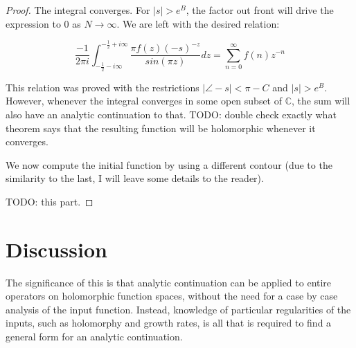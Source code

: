 \documentclass{article}
\begin{document}
\begin{proof}
		The integral converges. For $\left| s \right| > e^B$, the factor out front will drive the expression to 0 as $N \rightarrow \infty$. We are left with the desired relation:
		
		$$ \frac{-1}{2 \pi i} \int_{-\frac{1}{2} - i \infty}^{-\frac{1}{2} + i \infty} \frac{\pi f(z) (-s)^{-z}}{ sin( \pi z ) } dz = \sum_{n=0}^{\infty} f(n) z^{-n} $$
		
		This relation was proved with the restrictions $ \left| \angle -s \right| < \pi - C $ and $ \left| s \right| > e^B $. However, whenever the integral converges in some open subset of $\mathbb{C}$, the sum will also have an analytic continuation to that. 
		TODO: double check exactly what theorem says that the resulting function will be holomorphic whenever it converges.
		
		We now compute the initial function by using a different contour (due to the similarity to the last, I will leave some details to the reader). 
		
		TODO: this part.
		
		
		
		
		
		
		
		
		
		
		
		
	\end{proof}
	
	\section{ Discussion }
	
	The significance of this is that analytic continuation can be applied to entire operators on holomorphic function spaces, without the need for a case by case analysis of the input function. Instead, knowledge of particular regularities of the inputs, such as holomorphy and growth rates, is all that is required to find a general form for an analytic continuation. 
	
	
	
	
	
\end{document}
